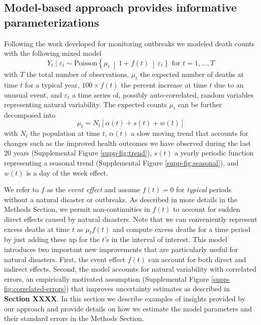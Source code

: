 \documentclass[11pt]{article}
\begin{document}
\subsection{Model-based approach provides informative parameterizations}
\label{subsec:model-based}
Following the work developed for monitoring outbreaks \cite{farrington1996statistical,hohle2008count,noufaily2013improved,salmon2016monitoring} we modeled death counts with the following mixed model
\begin{equation}
    Y_t \mid \varepsilon_t \sim 
    \mbox{Poisson}\left\{ \mu_t \right[1 + f(t) \left]  \varepsilon_t \right\} \mbox{ for } t = 1, \dots,T
\end{equation}
with $T$ the total number of observations, $\mu_t$ the expected number of deaths at time $t$ for a typical year, $100 \times f(t)$ the percent increase at time $t$  due to an unusual event, and $\varepsilon_t$ a time series of, possibly auto-correlated, random variables representing natural variability. The expected counts $\mu_t$ can be further decomposed into 
\begin{equation}
    \mu_t =N_t  [\alpha(t) + s(t) + w(t)]
\end{equation}
with $N_t$ the population at time $t$, $\alpha(t)$ a slow moving trend that accounts for changes such as the improved health outcomes we have observed during the last 20 years (Supplemental Figure \ref{supp-fig:trend}), $s(t)$ a yearly periodic function representing a seasonal trend (Supplemental Figure \ref{supp-fig:seasonal}), and $w(t)$ is a day of the week effect. 

We refer to $f$ as the \emph{event effect} and assume $f(t) = 0$ for \emph{typical} periods without a natural disaster or outbreaks.  As described in more details in the Methods Section, we permit non-continuities in $f(t)$ to account for sudden direct effects caused by natural disasters. Note that we can conveniently represent excess deaths at time $t$ as $\mu_t f(t)$ and compute excess deaths for a time period by just adding these up for the $t$'s in the interval of interest. This model introduces two important new improvements that are particularly useful for natural disasters. First, the event effect $f(t)$ can account for both direct and indirect effects. Second, the model accounts for natural variability with correlated errors, an empirically motivated assumption (Supplemental Figure \ref{supp-fig:correlated-errors}) that improves uncertainty estimates as described in \textbf{Section XXXX}. In this section we describe examples of insights provided by our approach and provide details on how we estimate the model parameters and their standard errors in the Methods Section.
\end{document}
